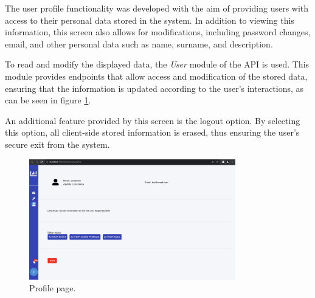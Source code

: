 The user profile functionality was developed with the aim of providing users with access to their personal data stored in the system. In addition to viewing this information, this screen also allows for modifications, including password changes, email, and other personal data such as name, surname, and description.

To read and modify the displayed data, the \textit{User} module of the \gls{API} is used. This module provides endpoints that allow access and modification of the stored data, ensuring that the information is updated according to the user's interactions, as can be seen in figure \ref{fig:profilePage}.

An additional feature provided by this screen is the logout option. By selecting this option, all client-side stored information is erased, thus ensuring the user's secure exit from the system.

\begin{figure}[htbp]
	\centering
	\includegraphics[width=0.8\textwidth]{images/profile.png}
	\caption{Profile page.}
	\label{fig:profilePage}
\end{figure}